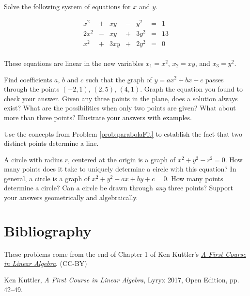 \documentclass{ximera}
\begin{document}
\begin{problem}\label{prb:quadratic}
Solve the following system of equations for $x$ and $y$.

\begin{equation*}
\begin{array}{rlrlrcr}
	  x^2 & + &   xy & - &   y^2 & = &  1 \\
	 2x^2 & - &   xy & + &  3y^2 & = & 13 \\
	  x^2 & + &  3xy & + &  2y^2 & = &  0 \\
\end{array}
\end{equation*}

\begin{hint}
These equations are linear in the new variables $x_{1} = x^{2}$, $x_{2} = xy$, and $x_{3} = y^{2}$.
\end{hint}
\end{problem}

\begin{problem}\label{prob:parabolaFit}
    Find coefficients $a$, $b$ and $c$ such that the graph of $y=ax^2+bx+c$ passes through the points $(-2, 1)$, $(2, 5)$, $(4, 1)$.  Graph the equation you found to check your answer.  Given any three points in the plane, does a solution always exist?  What are the possibilities when only two points are given?  What about more than three points?  Illustrate your answers with examples.
\end{problem}

\begin{problem}\label{prob:lineFit}
    Use the concepts from Problem \ref{prob:parabolaFit} to establish the fact that two distinct points determine a line.
\end{problem}

\begin{problem}\label{prob:circleFit}
    A circle with radius $r$, centered at the origin is a graph of $x^2+y^2-r^2=0$.  How many points does it take to uniquely determine a circle with this equation?  In general, a circle is a graph of $x^2+y^2+ax+by+c=0$.  How many points determine a circle?  Can a circle be drawn through \emph{any} three points?  Support your answers geometrically and algebraically.
\end{problem}


\section*{Bibliography}
These problems come from the end of Chapter 1 of Ken Kuttler's \href{https://open.umn.edu/opentextbooks/textbooks/a-first-course-in-linear-algebra-2017}{\it A First Course in Linear Algebra}. (CC-BY)

Ken Kuttler, {\it  A First Course in Linear Algebra}, Lyryx 2017, Open Edition, pp. 42--49. 
\end{document}
